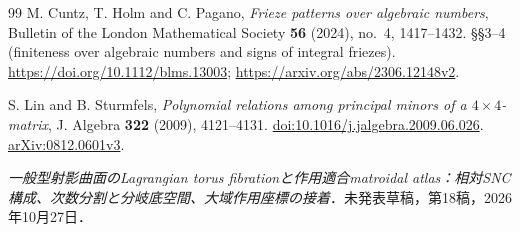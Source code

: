 \begin{thebibliography}{99}
M. Cuntz, T. Holm and C. Pagano,
\emph{Frieze patterns over algebraic numbers},
Bulletin of the London Mathematical Society \textbf{56} (2024), no.~4, 1417--1432.
\S\S3--4 (finiteness over algebraic numbers and signs of integral friezes).
\url{https://doi.org/10.1112/blms.13003};
\url{https://arxiv.org/abs/2306.12148v2}.

S. Lin and B. Sturmfels,
\emph{Polynomial relations among principal minors of a $4\times4$-matrix},
J. Algebra \textbf{322} (2009), 4121--4131.
\href{https://doi.org/10.1016/j.jalgebra.2009.06.026}{doi:10.1016/j.jalgebra.2009.06.026}.
\href{https://arxiv.org/abs/0812.0601}{arXiv:0812.0601v3}.

\emph{一般型射影曲面のLagrangian torus fibrationと作用適合matroidal atlas：相対SNC構成、次数分割と分岐底空間、大域作用座標の接着}．未発表草稿，第18稿，2026年10月27日．

\end{thebibliography}

